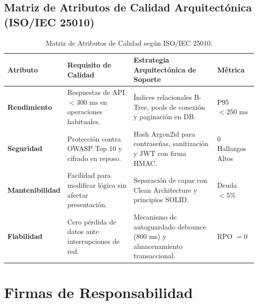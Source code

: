 \documentclass[12pt,a4paper]{article}
\begin{document}
\subsection{Matriz de Atributos de Calidad Arquitectónica (ISO/IEC 25010)}
\begin{table}[H]
\centering
\small
\renewcommand{\arraystretch}{1.2}
\begin{tabularx}{\textwidth}{|>{\hsize=0.9\hsize\raggedright\arraybackslash\bfseries\footnotesize}X|>{\hsize=1.3\hsize\raggedright\arraybackslash\footnotesize}X|>{\hsize=1.3\hsize\raggedright\arraybackslash\footnotesize}X|>{\hsize=0.5\hsize\centering\arraybackslash\footnotesize}X|}
\hline
\rowcolor{tableheader}
\textbf{Atributo} & \textbf{Requisito de Calidad} & \textbf{Estrategia Arquitectónica de Soporte} & \textbf{Métrica} \\
\hline
Rendimiento & Respuestas de API $<300\text{ ms}$ en operaciones habituales. & Índices relacionales B-Tree, pools de conexión y paginación en DB. & P95 $<250\text{ ms}$ \\
\hline
Seguridad & Protección contra OWASP Top 10 y cifrado en reposo. & Hash Argon2id para contraseñas, sanitización y JWT con firma HMAC. & 0 Hallazgos Altos \\
\hline
Mantenibilidad & Facilidad para modificar lógica sin afectar presentación. & Separación de capas con Clean Architecture y principios SOLID. & Deuda $<5\%$ \\
\hline
Fiabilidad & Cero pérdida de datos ante interrupciones de red. & Mecanismo de autoguardado debounce (800 ms) y almacenamiento transaccional. & RPO $= 0$ \\
\hline
\end{tabularx}
\caption{Matriz de Atributos de Calidad según ISO/IEC 25010.}
\end{table}

\section{Firmas de Responsabilidad}
\end{document}
